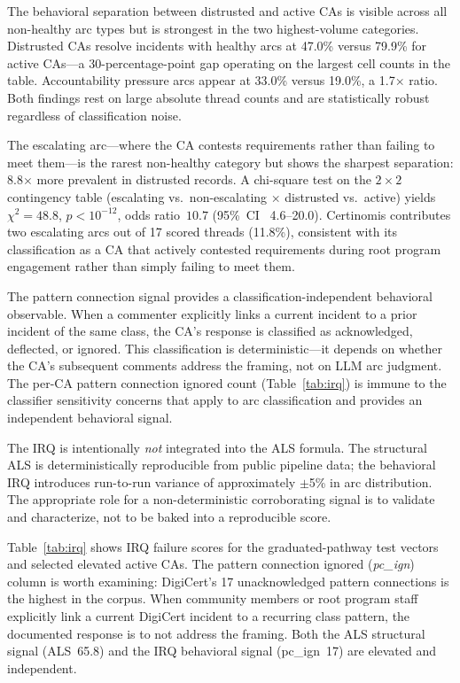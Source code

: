 \documentclass[10pt,twocolumn,letterpaper]{article}
\begin{document}
The behavioral separation between distrusted and active CAs is visible across
all non-healthy arc types but is strongest in the two highest-volume categories.
Distrusted CAs resolve incidents with healthy arcs at 47.0\% versus 79.9\% for
active CAs---a 30-percentage-point gap operating on the largest cell counts in
the table. Accountability pressure arcs appear at 33.0\% versus 19.0\%, a
1.7$\times$ ratio. Both findings rest on large absolute thread counts and are
statistically robust regardless of classification noise.

The escalating arc---where the CA contests requirements rather than failing to
meet them---is the rarest non-healthy category but shows the sharpest separation:
8.8$\times$ more prevalent in distrusted records. A chi-square test on the
$2\times 2$ contingency table (escalating vs.\ non-escalating $\times$ distrusted
vs.\ active) yields $\chi^2 = 48.8$, $p < 10^{-12}$, odds ratio~$10.7$ (95\%~CI~
4.6--20.0). Certinomis contributes two escalating arcs out of 17 scored
threads (11.8\%), consistent with its classification as a CA that actively
contested requirements during root program engagement rather than simply failing
to meet them.

The pattern connection signal provides a classification-independent behavioral
observable. When a commenter explicitly links a current incident to a prior
incident of the same class, the CA's response is classified as acknowledged,
deflected, or ignored. This classification is deterministic---it depends on
whether the CA's subsequent comments address the framing, not on LLM arc
judgment. The per-CA pattern connection ignored count (Table~\ref{tab:irq})
is immune to the classifier sensitivity concerns that apply to arc classification
and provides an independent behavioral signal.

The IRQ is intentionally \textit{not} integrated into the ALS formula. The structural
ALS is deterministically reproducible from public pipeline data; the behavioral IRQ
introduces run-to-run variance of approximately $\pm$5\% in arc distribution. The
appropriate role for a non-deterministic corroborating signal is to validate and
characterize, not to be baked into a reproducible score.

Table~\ref{tab:irq} shows IRQ failure scores for the graduated-pathway test vectors and
selected elevated active CAs. The pattern connection ignored (\textit{pc\_ign}) column
is worth examining: DigiCert's 17 unacknowledged pattern connections is the highest in
the corpus. When community members or root program staff explicitly link a current DigiCert
incident to a recurring class pattern, the documented response is to not address the
framing. Both the ALS structural signal (ALS~65.8) and the IRQ behavioral signal
(pc\_ign~17) are elevated and independent.
\end{document}
